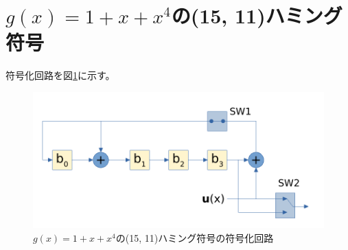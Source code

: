 \documentclass[a4paper,11pt]{jsarticle}
\begin{document}
\section{$g(x)=1+x+x^4$の(15, 11)ハミング符号}
符号化回路を図\ref{fig:hamming15-11-encoding}に示す。
\begin{figure}[htbp]
  \begin{center}
  \includegraphics[scale=1.0]{figures/hamming15-11-encoding.pdf}
  \end{center}
  \caption{$g(x)=1+x+x^4$の(15, 11)ハミング符号の符号化回路
  \label{fig:hamming15-11-encoding}
  }
\end{figure}
\end{document}
